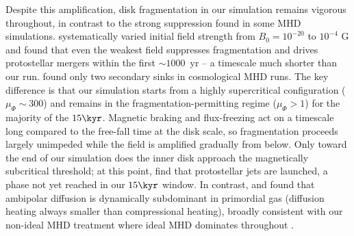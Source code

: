 Despite this amplification, disk fragmentation in our simulation
remains vigorous throughout, in contrast to the strong suppression
found in some MHD simulations.
\citet{machida25} systematically varied initial field strength from
$B_0 = 10^{-20}$ to $10^{-4}$ G and found that even the weakest
field suppresses fragmentation and drives protostellar mergers within
the first $\sim 1000$~yr -- a timescale much shorter than our run.
\citet{stacy22} found only two secondary sinks in cosmological MHD
runs.
The key difference is that our simulation starts from a highly
supercritical configuration ($\mu_\Phi \sim 300$) and remains in the
fragmentation-permitting regime ($\mu_\Phi > 1$) for the majority of
the $15\kyr$.
Magnetic braking and flux-freezing act on a timescale long compared
to the free-fall time at the disk scale, so fragmentation proceeds
largely unimpeded while the field is amplified gradually from below.
Only toward the end of our simulation does the inner disk approach
the magnetically subcritical threshold; at this point,
\citet{meziani26} find that protostellar jets are launched, a phase
not yet reached in our $15\kyr$ window.
In contrast, \citet{sadanari21} and \citet{sadanari23} found that
ambipolar diffusion is dynamically subdominant in primordial gas
(diffusion heating always smaller than compressional heating), broadly
consistent with our non-ideal MHD treatment where ideal MHD dominates
throughout \citep{meziani26}.
